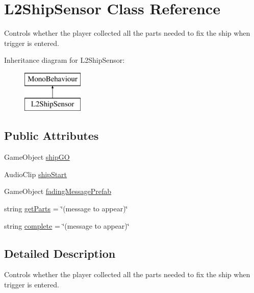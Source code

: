 \hypertarget{class_l2_ship_sensor}{\section{L2\-Ship\-Sensor Class Reference}
\label{class_l2_ship_sensor}
}


Controls whether the player collected all the parts needed to fix the ship when trigger is entered.  


Inheritance diagram for L2\-Ship\-Sensor\-:\begin{figure}[H]
\begin{center}
\leavevmode
\includegraphics[height=2.000000cm]{class_l2_ship_sensor}
\end{center}
\end{figure}
\subsection*{Public Attributes}
\begin{DoxyCompactItemize}
\item 
Game\-Object \hyperlink{class_l2_ship_sensor_a116a957e82ee35d2680cafd6d2dd53c0}{ship\-G\-O}
\item 
Audio\-Clip \hyperlink{class_l2_ship_sensor_a92c76b2b502112bc9c298154f77c76b1}{ship\-Start}
\item 
Game\-Object \hyperlink{class_l2_ship_sensor_a2d8958af9884c632331a9e031b9cfc78}{fading\-Message\-Prefab}
\item 
string \hyperlink{class_l2_ship_sensor_ab0ce9e2c72170c03532ad0f45ab105c1}{get\-Parts} = \char`\"{}(message to appear)\char`\"{}
\item 
string \hyperlink{class_l2_ship_sensor_aa262461caa8e7f1eaa5e65cc949cd16b}{complete} = \char`\"{}(message to appear)\char`\"{}
\end{DoxyCompactItemize}


\subsection{Detailed Description}
Controls whether the player collected all the parts needed to fix the ship when trigger is entered. 


